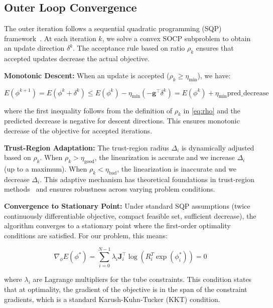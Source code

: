 \subsection{Outer Loop Convergence}

The outer iteration follows a sequential quadratic programming (SQP) framework~\cite{sqp}. At each iteration $k$, we solve a convex SOCP subproblem to obtain an update direction $\delta^k$. The acceptance rule based on ratio $\rho_k$ ensures that accepted updates decrease the actual objective.

\textbf{Monotonic Descent:} When an update is accepted ($\rho_k \geq \eta_{\text{min}}$), we have:

\begin{equation}
E(\phi^{k+1}) = E(\phi^k + \delta^k) \leq E(\phi^k) - \eta_{\text{min}} (-\mathbf{g}^\top \delta^k) = E(\phi^k) + \eta_{\text{min}} \text{pred\_decrease}
\end{equation}

where the first inequality follows from the definition of $\rho_k$ in \eqref{eq:rho} and the predicted decrease is negative for descent directions. This ensures monotonic decrease of the objective for accepted iterations.

\textbf{Trust-Region Adaptation:} The trust-region radius $\Delta_i$ is dynamically adjusted based on $\rho_k$. When $\rho_k > \eta_{\text{good}}$, the linearization is accurate and we increase $\Delta_i$ (up to a maximum). When $\rho_k < \eta_{\text{bad}}$, the linearization is inaccurate and we decrease $\Delta_i$. This adaptive mechanism has theoretical foundations in trust-region methods~\cite{conn} and ensures robustness across varying problem conditions.

\textbf{Convergence to Stationary Point:} Under standard SQP assumptions (twice continuously differentiable objective, compact feasible set, sufficient decrease), the algorithm converges to a stationary point where the first-order optimality conditions are satisfied. For our problem, this means:

\begin{equation}
\label{eq:stationary}
\nabla_\phi E(\phi^*) = \sum_{i=0}^{N-1} \lambda_i \mathbf{J}_i^{\top} \log(R_i^T \exp(\phi_i^*)) = 0
\end{equation}

where $\lambda_i$ are Lagrange multipliers for the tube constraints. This condition states that at optimality, the gradient of the objective is in the span of the constraint gradients, which is a standard Karush-Kuhn-Tucker (KKT) condition.

